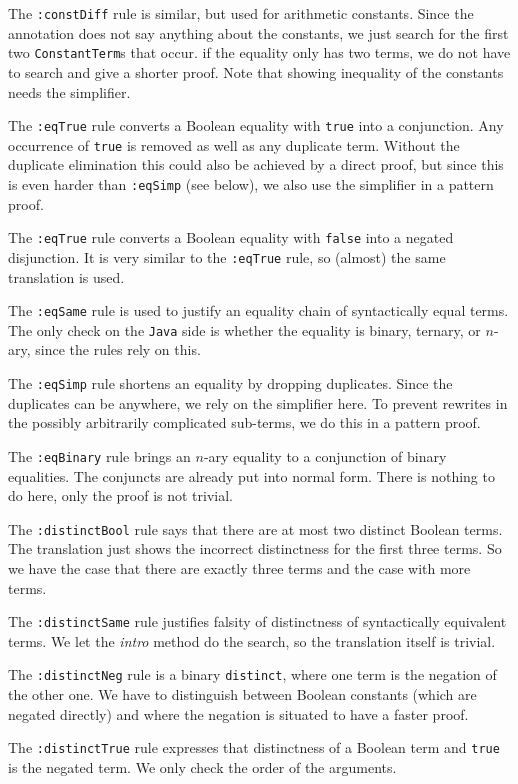 \documentclass[10pt,a4paper]{article}
\newcommand{\jav}{\texttt{Java}\xspace}
\newcommand{\ttt}{\texttt}
\newcommand{\true}{\ttt{true}\xspace}
\newcommand{\false}{\ttt{false}\xspace}
\begin{document}
The \ttt{:constDiff} rule is similar, but used for arithmetic constants. Since the annotation does not say anything about the constants, we just search for the first two \ttt{ConstantTerm}s that occur. if the equality only has two terms, we do not have to search and give a shorter proof. Note that showing inequality of the constants needs the simplifier.

The \ttt{:eqTrue} rule converts a Boolean equality with \true into a conjunction. Any occurrence of \true is removed as well as any duplicate term. Without the duplicate elimination this could also be achieved by a direct proof, but since this is even harder than \ttt{:eqSimp} (see below), we also use the simplifier in a pattern proof.

The \ttt{:eqTrue} rule converts a Boolean equality with \false into a negated disjunction. It is very similar to the \ttt{:eqTrue} rule, so (almost) the same translation is used.

The \ttt{:eqSame} rule is used to justify an equality chain of syntactically equal terms. The only check on the \jav side is whether the equality is binary, ternary, or $n$-ary, since the rules rely on this.

The \ttt{:eqSimp} rule shortens an equality by dropping duplicates. Since the duplicates can be anywhere, we rely on the simplifier here. To prevent rewrites in the possibly arbitrarily complicated sub-terms, we do this in a pattern proof.

The \ttt{:eqBinary} rule brings an $n$-ary equality to a conjunction of binary equalities. The conjuncts are already put into normal form. There is nothing to do here, only the proof is not trivial.

The \ttt{:distinctBool} rule says that there are at most two distinct Boolean terms. The translation just shows the incorrect distinctness for the first three terms. So we have the case that there are exactly three terms and the case with more terms.

The \ttt{:distinctSame} rule justifies falsity of distinctness of syntactically equivalent terms. We let the \emph{intro} method do the search, so the translation itself is trivial.

The \ttt{:distinctNeg} rule is a binary \ttt{distinct}, where one term is the negation of the other one. We have to distinguish between Boolean constants (which are negated directly) and where the negation is situated to have a faster proof.

The \ttt{:distinctTrue} rule expresses that distinctness of a Boolean term and \true is the negated term. We only check the order of the arguments.
\end{document}
